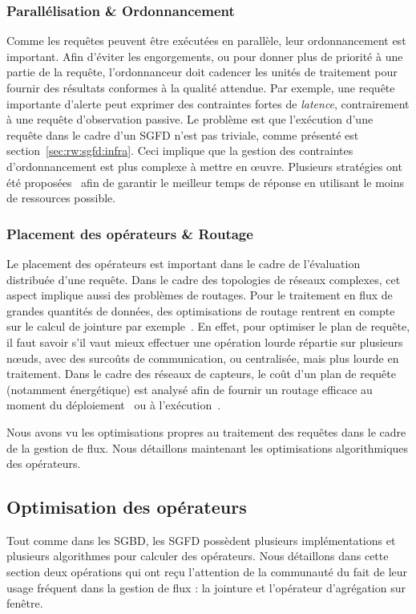 \subsubsection{Parallélisation \& Ordonnancement}
Comme les requêtes peuvent être exécutées en parallèle, leur ordonnancement est important. Afin d'éviter les engorgements, ou pour donner plus de priorité à une partie de la requête, l'ordonnanceur doit cadencer les unités de traitement pour fournir des résultats conformes à la qualité attendue. Par exemple, une requête importante d'alerte peut exprimer des contraintes fortes de \textit{latence}, contrairement à une requête d'observation passive. Le problème est que l'exécution d'une requête dans le cadre d'un SGFD n'est pas triviale, comme présenté est section~\ref{sec:rw:sgfd:infra}. Ceci implique que la gestion des contraintes d'ordonnancement est plus complexe à mettre en œuvre. Plusieurs stratégies ont été proposées~\cite{Babcock:chain, Jiang:scheduling} afin de garantir le meilleur temps de réponse en utilisant le moins de ressources possible.

\subsubsection{Placement des opérateurs \& Routage}
Le placement des opérateurs est important dans le cadre de l'évaluation distribuée d'une requête. Dans le cadre des topologies de réseaux complexes, cet aspect implique aussi des problèmes de routages. Pour le traitement en flux de grandes quantités de données, des optimisations de routage rentrent en compte sur le calcul de jointure par exemple~\cite{Zhou:pmjoin, Palma:p2p}. En effet, pour optimiser le plan de requête, il faut savoir s'il vaut mieux effectuer une opération lourde répartie sur plusieurs nœuds, avec des surcoûts de communication, ou centralisée, mais plus lourde en traitement. Dans le cadre des réseaux de capteurs, le coût d'un plan de requête (notamment énergétique) est analysé afin de fournir un routage efficace au moment du déploiement~\cite{Galpin:snee} ou à l'exécution~\cite{Madden:tinydb}.

Nous avons vu les optimisations propres au traitement des requêtes dans le cadre de la gestion de flux. Nous détaillons maintenant les optimisations algorithmiques des opérateurs.

\subsection{Optimisation des opérateurs}
Tout comme dans les SGBD, les SGFD possèdent plusieurs implémentations et plusieurs algorithmes pour calculer des opérateurs. Nous détaillons dans cette section deux opérations qui ont reçu l'attention de la communauté du fait de leur usage fréquent dans la gestion de flux : la jointure et l'opérateur d'agrégation sur fenêtre.

